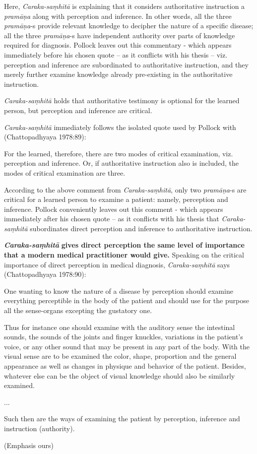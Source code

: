 Here, {\sl Caraka-saṃhitā} is explaining that it considers authoritative instruction a {\sl pramāṇa} along with perception and inference. In other words, all the three {\sl pramāṇa}-s provide relevant knowledge to decipher the nature of a specific disease; all the three {\sl pramāṇa}-s have independent authority over parts of knowledge required for diagnosis. Pollock leaves out this commentary - which appears immediately before his chosen quote -- as it conflicts with his thesis -- viz. perception and inference are subordinated to authoritative instruction, and they merely further examine knowledge already pre-existing in the authoritative instruction.

{\sl Caraka-saṃhitā} holds that authoritative testimony is optional for the learned person, but perception and inference are critical.

{\sl Caraka-saṃhitā} immediately follows the isolated quote used by Pollock with (Chattopadhyaya 1978:89):
\begin{myquote}
For the learned, therefore, there are two modes of critical examination, viz. perception and inference. Or, if authoritative instruction also is included, the modes of critical examination are three.
\end{myquote}

According to the above comment from {\sl Caraka-saṃhitā}, only two {\sl pramāṇa}-s are critical for a learned person to examine a patient: namely, perception and inference. Pollock conveniently leaves out this comment - which appears immediately after his chosen quote -- as it conflicts with his thesis that {\sl Caraka-saṃhitā} subordinates direct perception and inference to authoritative instruction.  

{{\sl\bfseries Caraka-saṃhitā}\relax} {\bf gives direct perception the same level of importance that a modern medical practitioner would give.} Speaking on the critical importance of direct perception in medical diagnosis, {\sl Caraka-saṃhitā} says (Chattopadhyaya 1978:90):
\begin{myquote}
One wanting to know the nature of a disease by perception should examine everything perceptible in the body of the patient and should use for the purpose all the sense-organs excepting the gustatory one. 

Thus for instance one should examine with the auditory sense the intestinal sounds, the sounds of the joints and finger knuckles, variations in the patient's voice, or any other sound that may be present in any part of the body.  With the visual sense are to be examined the color, shape, proportion and the general appearance as well as changes in physique and behavior of the patient.  Besides, whatever else can be the object of visual knowledge should also be similarly examined.

...

Such then are the ways of examining the patient by perception, inference and instruction (authority).

\hfill (Emphasis ours)
\end{myquote}

